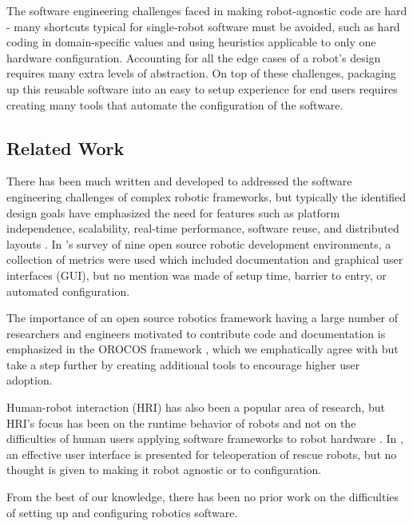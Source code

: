 \documentclass[10pt,journal,compsoc]{joser1}
\begin{document}
{The software engineering challenges faced in making robot-agnostic code are hard - many shortcuts typical for single-robot software must be avoided, such as hard coding in domain-specific values and using heuristics applicable to only one hardware configuration. Accounting for all the edge cases of a robot's design requires many extra levels of abstraction. On top of these challenges, packaging up this reusable software into an easy to setup experience for end users requires creating many tools that automate the configuration of the software.

\subsection{Related Work}

There has been much written and developed to addressed the software engineering challenges of complex robotic frameworks, but typically the identified design goals have emphasized the need for features such as platform independence, scalability, real-time performance, software reuse, and distributed layouts \cite{realtime_framework, collett2005player, kramer2007development}. In \cite{kramer2007development}'s survey of nine open source robotic development environments, a collection of metrics were used which included documentation and graphical user interfaces (GUI), but no mention was made of setup time, barrier to entry, or automated configuration. 

The importance of an open source robotics framework having a large number of researchers and engineers motivated to contribute code and documentation is emphasized in the OROCOS framework \cite{bruyninckx2001open}, which we emphatically agree with but take a step further by creating additional tools to encourage higher user adoption.
  
Human-robot interaction (HRI) has also been a popular area of research, but HRI's focus has been on the runtime behavior of robots and not on the difficulties of human users applying software frameworks to robot hardware \cite{hci_metrics, yancotaxonomy, goodrichseven}. In \cite{rescueRobots}, an effective user interface is presented for teleoperation of rescue robots, but no thought is given to making it robot agnostic or to configuration. 

From the best of our knowledge, there has been no prior work on the difficulties of setting up and configuring robotics software.

}
\end{document}
